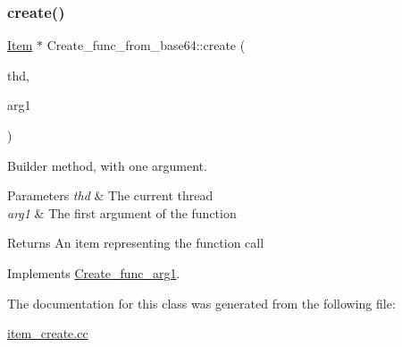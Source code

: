 \subsubsection{\texorpdfstring{create()}{create()}}
{\footnotesize\ttfamily \mbox{\hyperlink{classItem}{Item}} $\ast$ Create\+\_\+func\+\_\+from\+\_\+base64\+::create (\begin{DoxyParamCaption}\item[{T\+HD $\ast$}]{thd,  }\item[{\mbox{\hyperlink{classItem}{Item}} $\ast$}]{arg1 }\end{DoxyParamCaption})\hspace{0.3cm}{\ttfamily [virtual]}}

Builder method, with one argument. 
\begin{DoxyParams}{Parameters}
{\em thd} & The current thread \\
\hline
{\em arg1} & The first argument of the function \\
\hline
\end{DoxyParams}
\begin{DoxyReturn}{Returns}
An item representing the function call 
\end{DoxyReturn}


Implements \mbox{\hyperlink{classCreate__func__arg1_a3e9a98f755cd82c3e762e334c955a8c9}{Create\+\_\+func\+\_\+arg1}}.



The documentation for this class was generated from the following file\+:\begin{DoxyCompactItemize}
\item 
\mbox{\hyperlink{item__create_8cc}{item\+\_\+create.\+cc}}\end{DoxyCompactItemize}
